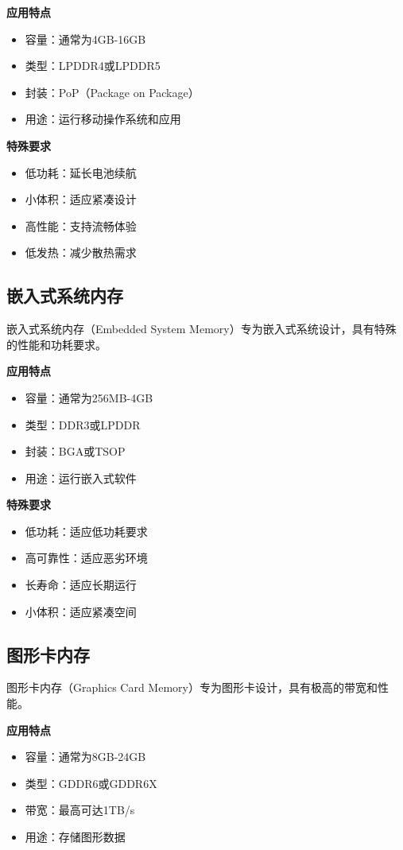 \documentclass{article}
\begin{document}
\textbf{应用特点}
\begin{itemize}
    \item 容量：通常为4GB-16GB
    \item 类型：LPDDR4或LPDDR5
    \item 封装：PoP（Package on Package）
    \item 用途：运行移动操作系统和应用
\end{itemize}

\textbf{特殊要求}
\begin{itemize}
    \item 低功耗：延长电池续航
    \item 小体积：适应紧凑设计
    \item 高性能：支持流畅体验
    \item 低发热：减少散热需求
\end{itemize}

\subsection{嵌入式系统内存}

嵌入式系统内存（Embedded System Memory）专为嵌入式系统设计，具有特殊的性能和功耗要求。

\textbf{应用特点}
\begin{itemize}
    \item 容量：通常为256MB-4GB
    \item 类型：DDR3或LPDDR
    \item 封装：BGA或TSOP
    \item 用途：运行嵌入式软件
\end{itemize}

\textbf{特殊要求}
\begin{itemize}
    \item 低功耗：适应低功耗要求
    \item 高可靠性：适应恶劣环境
    \item 长寿命：适应长期运行
    \item 小体积：适应紧凑空间
\end{itemize}

\subsection{图形卡内存}

图形卡内存（Graphics Card Memory）专为图形卡设计，具有极高的带宽和性能。

\textbf{应用特点}
\begin{itemize}
    \item 容量：通常为8GB-24GB
    \item 类型：GDDR6或GDDR6X
    \item 带宽：最高可达1TB/s
    \item 用途：存储图形数据
\end{itemize}
\end{document}
